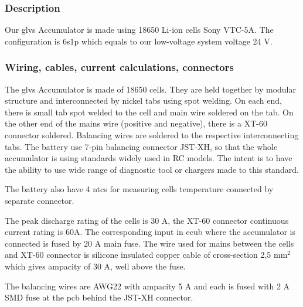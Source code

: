 \subsubsection{Description}
Our \gls{glvs} Accumulator is made using 18650 Li-ion cells Sony VTC-5A. The configuration is 6s1p which equals to our low-voltage system voltage 24 V.

\subsubsection{Wiring, cables, current calculations, connectors}

The \gls{glvs} Accumulator is made of 18650 cells. They are held together by modular structure and interconnected by nickel tabs using spot welding. On each end, there is small tab spot welded to the cell and main wire soldered on the tab. On the other end of the mains wire (positive and negative), there is a XT-60 connector soldered. Balancing wires are soldered to the respective interconnecting tabs. The battery use 7-pin balancing connector JST-XH, so that the whole accumulator is using standards widely used in RC models. The intent is to have the ability to use wide range of diagnostic tool or chargers made to this standard.

The battery also have 4 \glspl{ntc} for measuring cells temperature connected by separate connector.

The peak discharge rating of the cells is 30 A, the XT-60 connector continuous current rating is 60A. The corresponding input in \gls{ecub} where the accumulator is connected is fused by 20 A main fuse. The wire used for mains between the cells and XT-60 connector is silicone insulated copper cable of cross-section 2,5 mm$^2$ which gives ampacity of 30 A, well above the fuse.

The balancing wires are AWG22 with ampacity 5 A and each is fused with 2 A SMD fuse at the \gls{pcb} behind the JST-XH connector.

